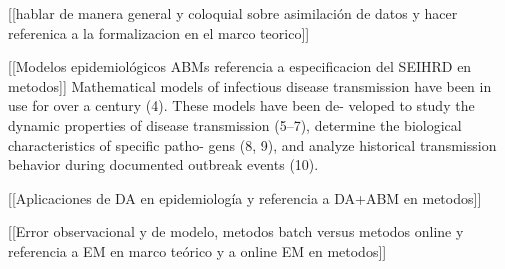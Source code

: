 [[hablar de manera general y coloquial sobre asimilación de datos y hacer referenica a la formalizacion en el marco teorico]]

[[Modelos epidemiológicos ABMs referencia a especificacion del SEIHRD en metodos]]
Mathematical models of infectious disease transmission have
been in use for over a century (4). These models have been de-
veloped to study the dynamic properties of disease transmission
(5–7), determine the biological characteristics of specific patho-
gens (8, 9), and analyze historical transmission behavior during
documented outbreak events (10).

[[Aplicaciones de DA en epidemiología y referencia a DA+ABM en metodos]]

[[Error observacional y de modelo, metodos batch versus metodos online y referencia a EM en marco teórico y a online EM en metodos]]


